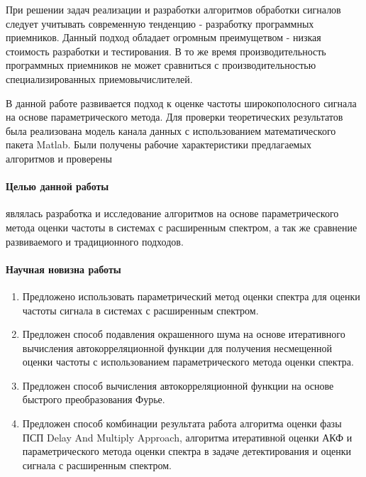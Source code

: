 При решении задач реализации и разработки алгоритмов обработки сигналов следует учитывать современную тенденцию - разработку
программных приемников. Данный подход обладает огромным преимущетвом - низкая стоимость разработки и тестирования. В то же
время производительность программных приемников не может сравниться с производительностью специализированных приемовычислителей.

В данной работе развивается подход к оценке частоты широкополосного сигнала на основе параметрического метода. Для проверки
теоретических результатов была реализована модель канала данных с использованием математического пакета Matlab. Были получены
рабочие характеристики предлагаемых алгоритмов и проверены 

\paragraph{Целью данной работы} являлась разработка и исследование алгоритмов на основе параметрического метода оценки частоты в системах 
с расширенным спектром, а так же сравнение развиваемого и традиционного подходов.

\paragraph{Научная новизна работы}
\begin{enumerate}
	\item{Предложено использовать параметрический метод оценки спектра для оценки частоты сигнала в системах с расширенным спектром.}
	\item{Предложен способ подавления окрашенного шума на основе итеративного вычисления автокорреляционной функции для
		получения несмещенной оценки частоты с использованием параметрического метода оценки спектра.}
	\item{Предложен способ вычисления автокорреляционной функции на основе быстрого преобразования Фурье.}
	\item{Предложен способ комбинации результата работа алгоритма оценки фазы ПСП Delay And Multiply Approach, алгоритма итеративной оценки АКФ и
		параметрического метода оценки спектра в задаче детектирования и оценки сигнала с расширенным спектром.}
\end{enumerate}

